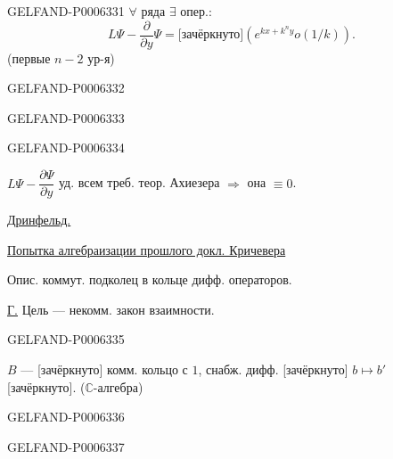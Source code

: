 \begin{GelfandAdjacentEvidence}{GELFAND-P000633}{1}
\(\forall\) ряда \(\exists\) опер.:
\[
L\Psi-\frac{\partial}{\partial y}\Psi=
\text{[зачёркнуто]}\left(e^{kx+k^ny}o(1/k)\right).
\]
(первые \(n-2\) ур-я)
\end{GelfandAdjacentEvidence}
\begin{GelfandAdjacentEvidence}{GELFAND-P000633}{2}

\end{GelfandAdjacentEvidence}
\begin{GelfandAdjacentEvidence}{GELFAND-P000633}{3}

\end{GelfandAdjacentEvidence}
\begin{GelfandAdjacentEvidence}{GELFAND-P000633}{4}


\(L\Psi-\dfrac{\partial\Psi}{\partial y}\)
уд. всем треб. теор. Ахиезера \(\Rightarrow\) она \(\equiv0\).

\underline{Дринфельд.}

\underline{Попытка алгебраизации прошлого докл. Кричевера}

Опис. коммут. подколец в кольце дифф. операторов.

\underline{Г.} Цель --- некомм. закон взаимности.
\end{GelfandAdjacentEvidence}
\begin{GelfandAdjacentEvidence}{GELFAND-P000633}{5}


\(B\) --- [зачёркнуто] комм. кольцо с \(1\), снабж. дифф.
[зачёркнуто] \(b\mapsto b'\) [зачёркнуто].
(\(\mathbb C\)-алгебра)
\end{GelfandAdjacentEvidence}
\begin{GelfandAdjacentEvidence}{GELFAND-P000633}{6}

\end{GelfandAdjacentEvidence}
\begin{GelfandAdjacentEvidence}{GELFAND-P000633}{7}

\end{GelfandAdjacentEvidence}
